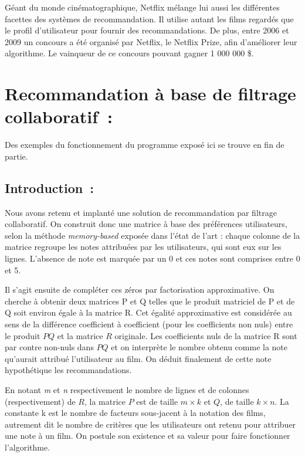 \documentclass{article}
\begin{document}
Géant du monde cinématographique, Netflix mélange lui aussi les différentes facettes des systèmes de recommandation. Il utilise autant les films regardés que le profil d'utilisateur pour fournir des recommandations. De plus, entre 2006 et 2009 un concours a été organisé par Netflix, le Netflix Prize, afin d'améliorer leur algorithme. Le vainqueur de ce concours pouvant gagner 1 000 000 \$.


\label{sec:orgda54585}
\section{Recommandation à base de filtrage collaboratif :}
\label{sec:orgc28a1b4}


Des exemples du fonctionnement du programme exposé ici se trouve en fin de partie.

\subsection{Introduction :}
\label{sec:orgfb9f7bf}

Nous avons retenu et implanté une solution de recommandation par filtrage
collaboratif. On construit donc une matrice à base des préférences
utilisateurs, selon la méthode \emph{memory-based} exposée dans l’état de l’art :
chaque colonne de la matrice regroupe les notes attribuées par les utilisateurs,
qui sont eux sur les lignes. L’absence de note est marquée par un 0 et ces
notes sont comprises entre 0 et 5.

Il s’agit ensuite de compléter ces zéros par factorisation
approximative. On cherche à obtenir deux matrices P et Q telles que le produit
matriciel de P et de Q soit environ égale à la matrice R. Cet égalité
approximative est considérée au sens de la différence coefficient à coefficient
(pour les coefficients non nuls) entre le produit $PQ$ et la matrice $R$ originale.
Les coefficients nuls de la matrice R sont par contre non-nuls dans $PQ$ et on
interprète le nombre obtenu comme la note qu’aurait attribué l’utilisateur au
film. On déduit finalement de cette note hypothétique les recommandations.

En notant \textit{m} et \textit{n} respectivement le nombre de lignes et de colonnes
(respectivement) de $R$, la matrice $P$ est de taille $m \times k$ et $Q$, de taille
$k \times n$. La constante k est le nombre de facteurs sous-jacent à la notation des
films, autrement dit le nombre de critères que les utilisateurs ont retenu pour
attribuer une note à un film. On postule son existence et sa valeur pour faire
fonctionner l’algorithme.
\end{document}
